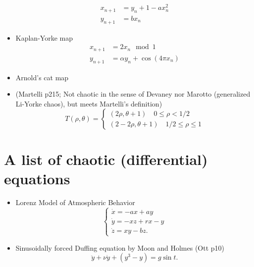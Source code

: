 \documentclass[11pt]{book}
\begin{document}
\begin{itemize}
    \begin{align*}
      x_{n+1} &= y_n + 1 - ax_n^2 \\
      y_{n+1} &= bx_n
    \end{align*}
  \item Kaplan-Yorke map
    \begin{align*}
      x_{n+1} &= 2x_n \mod 1    \\
      y_{n+1} &= \alpha y_n + \cos(4\pi x_n)
    \end{align*}
  \item Arnold's cat map
  \item (Martelli p215; Not chaotic in the sense of Devaney nor Marotto (generalized Li-Yorke chaos), 
    but meets Martelli's definition)
    \begin{equation*}
      T(\rho, \theta) =
      \begin{cases}
        (2\rho, \theta + 1) \quad 0\leq \rho < 1/2 \\
        (2 - 2\rho, \theta + 1) \quad 1/2 \leq \rho \leq 1
      \end{cases}
    \end{equation*}

\end{itemize}

\section{A list of chaotic (differential) equations}
\begin{itemize}
  \item Lorenz Model of Atmospheric Behavior
    \begin{equation*}
     \begin{cases}
      \dot{x} = -ax + ay \\
      \dot{y} = -xz + rx -y \\
      \dot{z} = xy - bz.
    \end{cases}
    \end{equation*}
  \item Sinusoidally forced Duffing equation by Moon and Holmes (Ott p10)
    \begin{equation*}
      \ddot{y} + \nu \dot{y} + (y^3 - y) = g\sin t.
    \end{equation*}
    \end{itemize}
\end{document}
